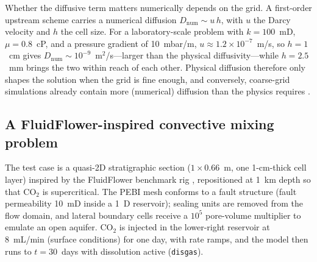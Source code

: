 \documentclass[preprint,11pt]{elsarticle}
\begin{document}
Whether the diffusive term matters numerically depends on the grid. A
first-order upstream scheme carries a numerical diffusion
$D_{\mathrm{num}}\sim u\,h$, with $u$ the Darcy velocity and $h$ the
cell size. For a laboratory-scale problem with $k=100$~mD,
$\mu=0.8$~cP, and a pressure gradient of 10~mbar/m,
$u\approx1.2\times10^{-7}$~m/s, so $h=1$~cm gives
$D_{\mathrm{num}}\sim10^{-9}$~m$^2$/s---larger than the physical
diffusivity---while $h=2.5$~mm brings the two within reach of each
other. Physical diffusion therefore only shapes the solution when the
grid is fine enough, and conversely, coarse-grid simulations already
contain more (numerical) diffusion than the physics requires
\cite{salo2024}.

\subsection{A FluidFlower-inspired convective mixing problem}

The test case is a quasi-2D stratigraphic section
($1\times0.66$~m, one 1-cm-thick cell layer) inspired by the FluidFlower
benchmark rig \cite{flemisch2024}, repositioned at 1~km depth so that
CO$_2$ is supercritical. The PEBI mesh conforms to a fault structure
(fault permeability 10~mD inside a 1~D reservoir); sealing units are
removed from the flow domain, and lateral boundary cells receive a
$10^5$ pore-volume multiplier to emulate an open aquifer. CO$_2$ is
injected in the lower-right reservoir at \SI{8}{mL/min} (surface
conditions) for one day, with rate ramps, and the model then runs to
$t=30$~days with dissolution active (\texttt{disgas}).
\end{document}
